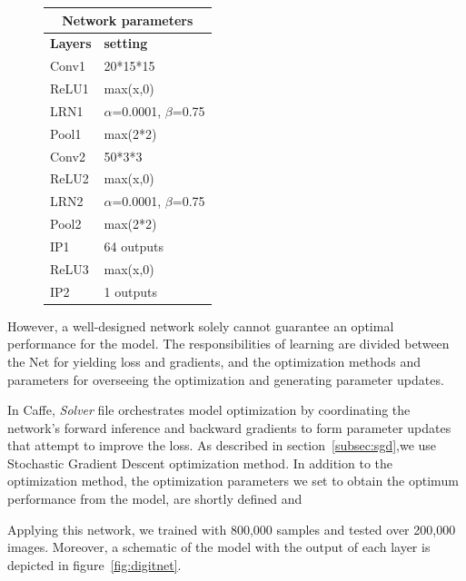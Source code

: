 \begin{figure}[H]
\centering
\begin{tabular}{ |p{2cm}|p{2.5cm}| }
\hline 
\multicolumn{2}{|c|}{\textbf{Network parameters}} \\
\hline
\hline
\textbf{Layers} & \textbf{setting }\\
\hline
Conv1 & 20*15*15\\
\hline
ReLU1 & max(x,0)  \\
\hline
LRN1 & $\alpha$=0.0001, $\beta$=0.75\\
\hline
Pool1    & max(2*2) \\
\hline
Conv2 & 50*3*3\\
\hline
ReLU2 & max(x,0)  \\
\hline
LRN2 & $\alpha$=0.0001, $\beta$=0.75\\
\hline
Pool2    & max(2*2) \\
\hline
IP1 & 64 outputs \\
\hline
ReLU3 & max(x,0)  \\
\hline
IP2 & 1 outputs \\
\hline
\end{tabular}
\end{figure}

However, a well-designed network solely cannot guarantee an optimal performance for the model. The responsibilities of learning are divided between the Net for yielding loss and gradients, and the optimization methods and parameters for overseeing the optimization and generating parameter updates. 

\indent In Caffe, \textit{Solver} file  orchestrates model optimization by coordinating the network’s forward inference and backward gradients to form parameter updates that attempt to improve the loss. As described in section~\ref{subsec:sgd},we use Stochastic Gradient Descent optimization method. In addition to the optimization method, the optimization parameters we set to obtain the optimum performance from the model, are shortly defined and 












Applying this network, we trained with 800,000 samples and tested over 200,000 images. 
Moreover, a schematic of the model with the output of each layer is depicted in figure~\ref{fig:digitnet}.










